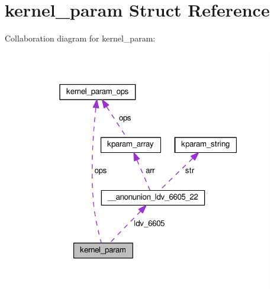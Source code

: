 \hypertarget{structkernel__param}{}\section{kernel\+\_\+param Struct Reference}
\label{structkernel__param}


Collaboration diagram for kernel\+\_\+param\+:
\nopagebreak
\begin{figure}[H]
\begin{center}
\leavevmode
\includegraphics[width=304pt]{structkernel__param__coll__graph}
\end{center}
\end{figure}
